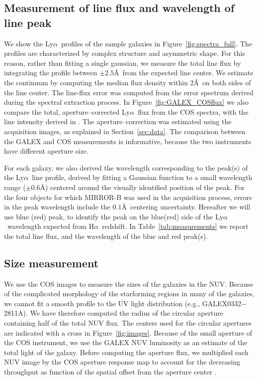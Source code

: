 \documentclass[manuscript]{emulateapj}
\newcommand{\lya}{Ly$\alpha$}
\newcommand{\ha}{H$\alpha$}
\begin{document}
\subsection{Measurement of line flux and wavelength of line peak}\label{sect:peakmeas}

We show the \lya\ profiles of the sample galaxies in
Figure~\ref{fig:spectra_full}.  The profiles are characterized by complex
structure and asymmetric shape.  For this reason, rather than fitting
a single gaussian, we measure the total line flux by integrating the
profile between $\pm 2.5$\AA\ from the expected line center. We
estimate the continuum by computing the median flux density within
2\AA\ on both sides of the line center. The line-flux error was
computed from the error spectrum derived during the spectral
extraction process.  In Figure~\ref{fig:GALEX_COSflux} we also compare the
total, aperture--corrected \lya\ flux from the COS spectra, with the
line intensity derived in \citet{cowie2011}. The aperture--correction
was estimated using the acquisition images, as explained in
Section~\ref{sec:data}. The comparison between the GALEX and COS
measurements is informative, because the two instruments have
different aperture size. 



For each galaxy, we also derived the wavelength
corresponding to the peak(s) of the \lya\ line profile, derived by
fitting a Gaussian function to a small wavelength range ($\pm 0.6$\AA)
centered around the visually identified position of the peak. For the
four objects for which MIRROR-B was used in the acquisition process,
errors in the peak wavelength include the $0.1$\AA\ centering
uncertainty.  Hereafter we will use blue (red) peak, to identify the
peak on the blue(red) side of the \lya\ wavelength expected from \ha\
redshift. In Table~\ref{tab:measurements} we report the total line
flux, and the wavelength of the blue and red peak(s).


\subsection{Size measurement}
We use the COS images to measure the sizes of the galaxies in the NUV.
Because of the complicated morphology of the starforming regions in
many of the galaxies, we cannot fit a smooth profile to the UV light
distribution (e.g., GALEX0332$-$2811A). We have therefore computed the
radius of the circular aperture containing half of the total NUV
flux. The centers used for the circular apertures are indicated with a
cross in Figure~\ref{fig:images}.  Because of the small aperture of
the COS instrument, we use the GALEX NUV luminosity as an estimate of
the total light of the galaxy. Before computing the aperture flux, we
multiplied each NUV image by the COS aperture response map to account
for the decreasing throughput as function of the spatial offset from
the aperture center \citep{Goudfrooij2010}.
\end{document}
